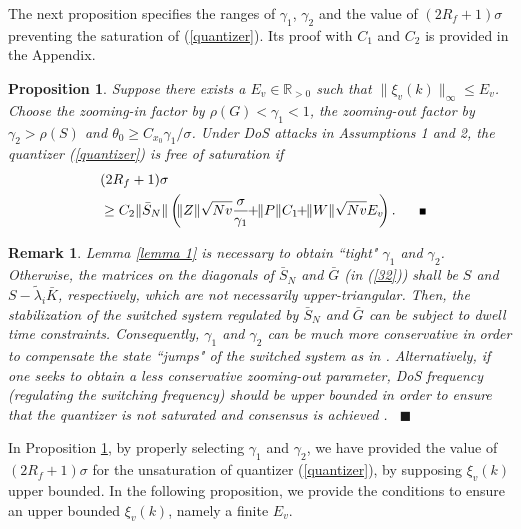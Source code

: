 \documentclass{autart}
\def\qedp{\hspace*{\fill}~{\tiny $\blacksquare$}}
\def\qedp{\hspace*{\fill}~{\tiny $\blacksquare$}}
\newtheorem{itproposition}{Proposition}
\newtheorem{itremark}{Remark}
\newenvironment{proposition}{\begin{itproposition}\rm}{\end{itproposition}}
\newenvironment{remark}{\begin{itremark}\rm}{\end{itremark}}
\begin{document}
The next proposition specifies the ranges of $\gamma_1$, $\gamma_2$ and the value of $(2R_f +1)\sigma$ preventing the saturation of (\ref{quantizer}). Its proof with $C_1$ and $C_2$ is provided in the Appendix. 

\begin{proposition}\label{pro 1}
	Suppose there exists a $E_v \in \mathbb R_{>0}$ such that $\|\xi_v(k)\|_ \infty \le E_v $. Choose the zooming-in factor by $ \rho (G)< \gamma_1 <1 $, the zooming-out factor by $\gamma_2 > \rho(S)$ and $\theta_0 \ge C_{x_0}\gamma_1/\sigma$. Under DoS attacks in Assumptions 1 and 2, the quantizer (\ref{quantizer}) is free of saturation if 
	\begin{align}
\quad	&\!\!\! (2R_f+1)\sigma \nonumber\\
	&\!\!\! \ge C_2 \|\bar S_N \|\left(\!\!  \|Z\|\sqrt{Nv}\frac{\sigma}{\gamma_1} \!\! +\!\!  \|P\| C_1 \!\! +  \!\!  \|W\| \sqrt{Nv}E_v   \!\!\right). \quad  \,\,\text{\qedp} \nonumber
	\end{align}
\end{proposition}





\begin{remark}\label{remark 2}
Lemma \ref{lemma 1} is necessary to obtain ``tight" $\gamma_1$ and $\gamma_2$. Otherwise, the matrices on the diagonals of $\bar S_N$ and $\bar G$ (in (\ref{32})) shall be $S$ and $S- \tilde \lambda_i \bar K$, respectively, which are not necessarily upper-triangular. Then, the stabilization of the switched system regulated by $\bar S_N$ and $\bar G$ can be subject to dwell time constraints. Consequently, $\gamma_1$ and $\gamma_2$ can be much more conservative in order to compensate the state ``jumps" of the switched system as in \cite{feng2020arxiv}. Alternatively, if one seeks to obtain a less conservative zooming-out parameter, DoS frequency (regulating the switching frequency) should be upper bounded in order to ensure that the quantizer is not saturated and consensus is achieved \cite{feng2023tcns}. 
\qedp
\end{remark}

In Proposition \ref{pro 1}, by properly selecting $\gamma_1$ and $\gamma_2$, we have provided the value of $(2R_f+1)\sigma$ for the unsaturation of quantizer (\ref{quantizer}), by supposing $\xi_v(k)$ upper bounded. In the following proposition, we provide the conditions to ensure an upper bounded $\xi_v(k)$, namely a finite $E_v$.
\end{document}
